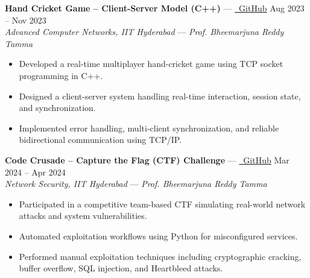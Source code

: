 \documentclass[a4paper,10pt]{article}
\begin{document}
\textbf{Hand Cricket Game – Client-Server Model (C++)} --- \href{https://github.com/AgarwalKritik/Public/tree/9c16d3b6eb24ff6961c71bca02ae82dc4602339f/M.Tech%20%40%20IIT-Hyderabad/CS5060-Advanced%20Computer%20Networks/Socket%20Programming/Hand%20Cricket}{\faCodeBranch~GitHub} \hfill Aug 2023 -- Nov 2023 \\
\textit{Advanced Computer Networks, IIT Hyderabad} --- \textit{Prof. Bheemarjuna Reddy Tamma} \\
\vspace{-12pt}
\begin{itemize}[leftmargin=*, itemsep=1.7mm, rightmargin=2ex]
    \item Developed a real-time multiplayer hand-cricket game using TCP socket programming in C++. \vspace{-8pt}
    \item Designed a client-server system handling real-time interaction, session state, and synchronization. \vspace{-8pt}
    \item Implemented error handling, multi-client synchronization, and reliable bidirectional communication using TCP/IP.
\end{itemize}
\vspace{3pt}

\textbf{Code Crusade – Capture the Flag (CTF) Challenge} --- \href{https://github.com/AgarwalKritik/Public/tree/9c16d3b6eb24ff6961c71bca02ae82dc4602339f/M.Tech%20%40%20IIT-Hyderabad/CS6903-Network%20Security/CTF%20Assignment}{\faCodeBranch~GitHub} \hfill Mar 2024 -- Apr 2024 \\
\textit{Network Security, IIT Hyderabad} --- \textit{Prof. Bheemarjuna Reddy Tamma} \\
\vspace{-12pt}
\begin{itemize}[leftmargin=*, itemsep=1.7mm, rightmargin=2ex]
    \item Participated in a competitive team-based CTF simulating real-world network attacks and system vulnerabilities. \vspace{-8pt}
    \item Automated exploitation workflows using Python for misconfigured services. \vspace{-8pt}
    \item Performed manual exploitation techniques including cryptographic cracking, buffer overflow, SQL injection, and Heartbleed attacks.
\end{itemize}
\end{document}
